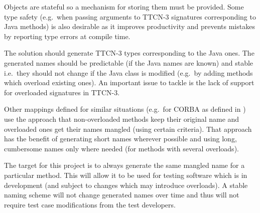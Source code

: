 Objects are stateful so a mechanism for storing them must be provided.
Some type safety
(e.g.\ when passing arguments to \ac{TTCN-3} signatures
corresponding to Java methods)
is also desirable as it improves productivity and prevents mistakes
by reporting type errors at compile time.

The solution should generate \ac{TTCN-3} types corresponding to the Java ones.
The generated names should be predictable (if the Java names are known)
and stable i.e.\ they should not change if the Java class is modified
(e.g.\ by adding methods which overload existing ones).
An important issue to tackle is
the lack of support for overloaded signatures in \ac{TTCN-3}.

Other mappings defined for similar situations
(e.g.\ for \ac{CORBA} as defined in
\citep[sec.~4.3.2.6]{website:java2idl-mapping})
use the approach that non-overloaded methods keep their original name
and overloaded ones get their names mangled (using certain criteria).
That approach has the benefit of generating short names wherever possible
and using long, cumbersome names only where needed
(for methods with several overloads).

The target for this project is
to always generate the same mangled name for a particular method.
This will allow it to be used for testing software which is in development
(and subject to changes which may introduce overloads).
A stable naming scheme will not change generated names over time
and thus will not require test case modifications from the test developers.
